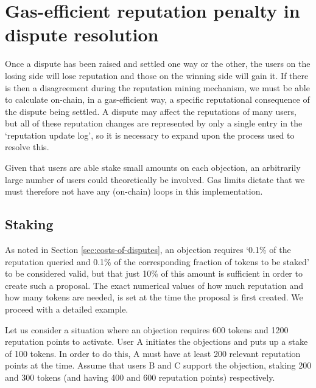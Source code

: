 \section{Gas-efficient reputation penalty in dispute resolution}\label{appendix:rep-transfer}

Once a dispute has been raised and settled one way or the other, the users on the losing side will lose reputation and those on the winning side will gain it. If there is then a disagreement during the reputation mining mechanism, we must be able to calculate on-chain, in a gas-efficient way, a specific reputational consequence of the dispute being settled. A dispute may affect the reputations of many users, but all of these reputation changes are represented by only a single entry in the `reputation update log', so it is necessary to expand upon the process used to resolve this.

Given that users are able stake small amounts on each objection, an arbitrarily large number of users could theoretically be involved. Gas limits dictate that we must therefore not have any (on-chain) loops in this implementation.

\subsection{Staking}

As noted in Section \ref{sec:costs-of-disputes}, an objection requires `0.1\% of the reputation queried and 0.1\% of the corresponding fraction of tokens to be staked' to be considered valid, but that just 10\% of this amount is sufficient in order to create such a proposal. The exact numerical values of how much reputation and how many tokens are needed, is set at the time the proposal is first created. We proceed with a detailed example.

Let us consider a situation where an objection requires 600 tokens and 1200 reputation points to activate. User A initiates the objections and puts up a stake of 100 tokens. In order to do this, A must have at least 200 relevant reputation points at the time. Assume that users B and C support the objection, staking 200 and 300 tokens (and having 400 and 600 reputation points) respectively.

